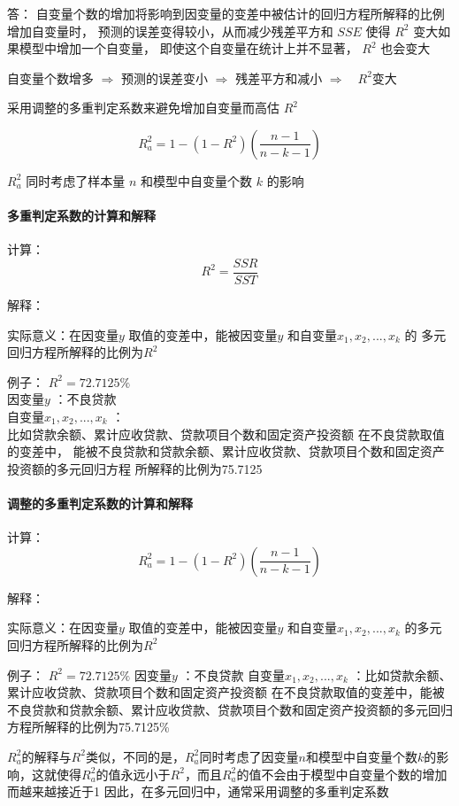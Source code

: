 \documentclass[UTF8,10pt]{book}
\begin{document}
{\kaishu 答： 自变量个数的增加将影响到因变量的变差中被估计的回归方程所解释的比例增加自变量时，
预测的误差变得较小，从而减少残差平方和 $SSE$ 
使得 $R^2$ 变大如果模型中增加一个自变量，
即使这个自变量在统计上并不显著， $R^2$ 也会变大 }

自变量个数增多 $\Rightarrow$ 预测的误差变小 $\Rightarrow$ 残差平方和减小 $\Rightarrow \quad R^2$变大 

采用调整的多重判定系数来避免增加自变量而高估 $R^2$ 

$$ R_a^2 =1-(1-R^2)(\frac{n-1}{n-k-1}) $$ 

$R_a^2$ 同时考虑了样本量 $ n$ 和模型中自变量个数 $k$ 的影响

\paragraph{多重判定系数的计算和解释}

计算： 
$$ R^2 = \frac{SSR}{SST} $$ 

解释： 

实际意义：在因变量$y$ 取值的变差中，能被因变量$y$ 和自变量$x_1,x_2,...,x_k$ 的
多元回归方程所解释的比例为$R^2$ 

例子： $R^2=72.7125\% $ \\
因变量$y$ ：不良贷款 \\
自变量$x_1,x_2,...,x_k$ ：\\
比如贷款余额、累计应收贷款、贷款项目个数和固定资产投资额 在不良贷款取值的变差中，
能被不良贷款和贷款余额、累计应收贷款、贷款项目个数和固定资产投资额的多元回归方程
所解释的比例为75.7125%

\paragraph{调整的多重判定系数的计算和解释}	

计算： 
$$ R_a^2 =1-(1-R^2)(\frac{n-1}{n-k-1}) $$ 

解释： 

实际意义：在因变量$y$ 取值的变差中，能被因变量$y$ 和自变量$x_1,x_2,...,x_k$ 的多元回归方程所解释的比例为$R^2$ 

例子： $R^2=72.7125\% $ 因变量$y$ ：不良贷款 自变量$x_1,x_2,...,x_k$ ：比如贷款余额、累计应收贷款、贷款项目个数和固定资产投资额 在不良贷款取值的变差中，能被不良贷款和贷款余额、累计应收贷款、贷款项目个数和固定资产投资额的多元回归方程所解释的比例为75.7125\% 

$R_a^2$的解释与$R^2$类似，不同的是，$R_a^2$同时考虑了因变量$n$和模型中自变量个数$k$的影响，这就使得$R_a^2$的值永远小于$R^2$，而且$R_a^2$的值不会由于模型中自变量个数的增加而越来越接近于1 因此，在多元回归中，通常采用调整的多重判定系数
\end{document}
